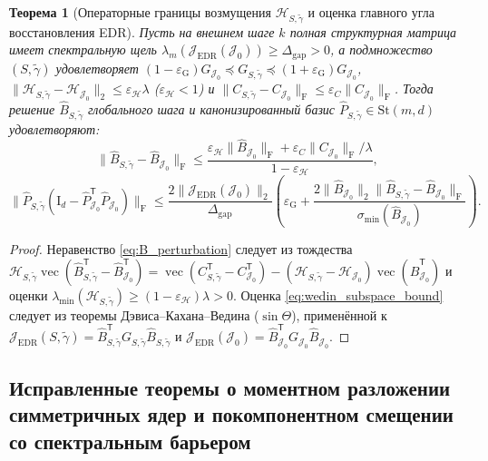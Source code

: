 \documentclass[11pt,a4paper]{article}
\newcommand{\Id}{\mathrm{I}}
\newcommand{\T}{^{\mathsf{T}}}
\newcommand{\F}{_{\mathrm{F}}}
\newcommand{\St}{\mathrm{St}}
\newcommand{\JEDR}{\mathcal{J}_{\mathrm{EDR}}}
\newcommand{\JJJ}{\mathcal{J}}
\newtheorem{theorem}{Теорема}[section]
\theoremstyle{definition}
\theoremstyle{remark}
\begin{document}
\begin{theorem}[Операторные границы возмущения $\mathcal{H}_{S,\tilde{\gamma}}$ и оценка главного угла восстановления EDR]\label{thm:wedin_edr}
Пусть на внешнем шаге $k$ полная структурная матрица имеет спектральную щель $\lambda_m(\JEDR(\JJJ_0)) \ge \Delta_{\mathrm{gap}} > 0$, а подмножество $(S, \tilde{\gamma})$ удовлетворяет $(1 - \varepsilon_{\mathrm{G}})G_{\JJJ_0} \preceq G_{S,\tilde{\gamma}} \preceq (1 + \varepsilon_{\mathrm{G}})G_{\JJJ_0}$, $\|\mathcal{H}_{S,\tilde{\gamma}} - \mathcal{H}_{\JJJ_0}\|_2 \le \varepsilon_{\mathcal{H}}\lambda$ ($\varepsilon_{\mathcal{H}} < 1$) и $\|C_{S,\tilde{\gamma}} - C_{\JJJ_0}\|\F \le \varepsilon_C \|C_{\JJJ_0}\|\F$. Тогда решение $\hat{B}_{S,\tilde{\gamma}}$ глобального шага и канонизированный базис $\hat{P}_{S,\tilde{\gamma}} \in \St(m,d)$ удовлетворяют:
\begin{equation}\label{eq:B_perturbation}
    \bigl\|\hat{B}_{S,\tilde{\gamma}} - \hat{B}_{\JJJ_0}\bigr\|\F \le \frac{\varepsilon_{\mathcal{H}} \|\hat{B}_{\JJJ_0}\|\F + \varepsilon_C \|C_{\JJJ_0}\|\F / \lambda}{1 - \varepsilon_{\mathcal{H}}},
\end{equation}
\begin{equation}\label{eq:wedin_subspace_bound}
    \bigl\|\hat{P}_{S,\tilde{\gamma}}(\Id_d - \hat{P}_{\JJJ_0}\T \hat{P}_{\JJJ_0})\bigr\|\F \le \frac{2 \|\JEDR(\JJJ_0)\|_2}{\Delta_{\mathrm{gap}}} \left(\varepsilon_{\mathrm{G}} + \frac{2 \|\hat{B}_{\JJJ_0}\|_2 \|\hat{B}_{S,\tilde{\gamma}} - \hat{B}_{\JJJ_0}\|\F}{\sigma_{\min}(\hat{B}_{\JJJ_0})}\right).
\end{equation}
\end{theorem}
\begin{proof}
Неравенство \eqref{eq:B_perturbation} следует из тождества $\mathcal{H}_{S,\tilde{\gamma}}\operatorname{vec}(\hat{B}_{S,\tilde{\gamma}}\T - \hat{B}_{\JJJ_0}\T) = \operatorname{vec}(C_{S,\tilde{\gamma}}\T - C_{\JJJ_0}\T) - (\mathcal{H}_{S,\tilde{\gamma}} - \mathcal{H}_{\JJJ_0})\operatorname{vec}(\hat{B}_{\JJJ_0}\T)$ и оценки $\lambda_{\min}(\mathcal{H}_{S,\tilde{\gamma}}) \ge (1 - \varepsilon_{\mathcal{H}})\lambda > 0$. Оценка \eqref{eq:wedin_subspace_bound} следует из теоремы Дэвиса--Кахана--Ведина ($\sin\Theta$), применённой к $\JEDR(S,\tilde{\gamma}) = \hat{B}_{S,\tilde{\gamma}}\T G_{S,\tilde{\gamma}}\hat{B}_{S,\tilde{\gamma}}$ и $\JEDR(\JJJ_0) = \hat{B}_{\JJJ_0}\T G_{\JJJ_0}\hat{B}_{\JJJ_0}$.
\end{proof}

\subsection{Исправленные теоремы о моментном разложении симметричных ядер и покомпонентном смещении со спектральным барьером}
\end{document}
